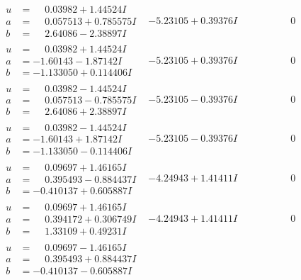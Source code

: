 \documentclass[1p]{elsarticle_modified}
\theoremstyle{definition}
\begin{document}
$$\begin{array}{c|c|c}
\begin{aligned}
u &= \phantom{-}0.03982 + 1.44524 I \\
a &= \phantom{-}0.057513 + 0.785575 I \\
b &= \phantom{-}2.64086 - 2.38897 I\end{aligned}
 & -5.23105 + 0.39376 I & \phantom{-0.000000 } 0 \\ \hline\begin{aligned}
u &= \phantom{-}0.03982 + 1.44524 I \\
a &= -1.60143 - 1.87142 I \\
b &= -1.133050 + 0.114406 I\end{aligned}
 & -5.23105 + 0.39376 I & \phantom{-0.000000 } 0 \\ \hline\begin{aligned}
u &= \phantom{-}0.03982 - 1.44524 I \\
a &= \phantom{-}0.057513 - 0.785575 I \\
b &= \phantom{-}2.64086 + 2.38897 I\end{aligned}
 & -5.23105 - 0.39376 I & \phantom{-0.000000 } 0 \\ \hline\begin{aligned}
u &= \phantom{-}0.03982 - 1.44524 I \\
a &= -1.60143 + 1.87142 I \\
b &= -1.133050 - 0.114406 I\end{aligned}
 & -5.23105 - 0.39376 I & \phantom{-0.000000 } 0 \\ \hline\begin{aligned}
u &= \phantom{-}0.09697 + 1.46165 I \\
a &= \phantom{-}0.395493 - 0.884437 I \\
b &= -0.410137 + 0.605887 I\end{aligned}
 & -4.24943 + 1.41411 I & \phantom{-0.000000 } 0 \\ \hline\begin{aligned}
u &= \phantom{-}0.09697 + 1.46165 I \\
a &= \phantom{-}0.394172 + 0.306749 I \\
b &= \phantom{-}1.33109 + 0.49231 I\end{aligned}
 & -4.24943 + 1.41411 I & \phantom{-0.000000 } 0 \\ \hline\begin{aligned}
u &= \phantom{-}0.09697 - 1.46165 I \\
a &= \phantom{-}0.395493 + 0.884437 I \\
b &= -0.410137 - 0.605887 I\end{aligned}

\end{array}$$
\end{document}

